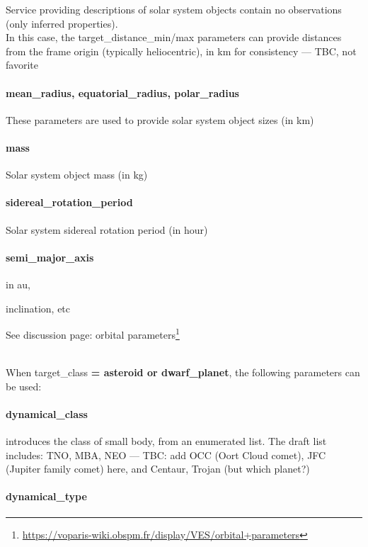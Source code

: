 \documentclass[11pt,a4paper]{ivoa}
\begin{document}
Service providing descriptions of solar system objects contain
no observations (only inferred properties).\\
In this case, the target\_distance\_min/max parameters
can provide distances from the frame origin (typically heliocentric),
in km for consistency --- TBC, not favorite

\paragraph{mean\_radius, equatorial\_radius, polar\_radius}

These parameters are used to provide solar system object sizes (in km)

\paragraph{mass}

Solar system object mass (in kg)

\paragraph{sidereal\_rotation\_period}

Solar system sidereal rotation period (in hour)

\paragraph{semi\_major\_axis}

in au,

inclination, etc

See discussion page: orbital
parameters\footnote{\url{https://voparis-wiki.obspm.fr/display/VES/orbital+parameters}}


\textbf{\\}When target\_class\textbf{ = asteroid or dwarf\_planet},
the following parameters can be used:

\paragraph{dynamical\_class}

introduces the class of small body, from an enumerated list.
The draft list includes: TNO, MBA, NEO --- TBC: add OCC (Oort Cloud comet),
JFC (Jupiter family comet) here, and Centaur, Trojan (but which planet?)

\paragraph{dynamical\_type}
\end{document}
